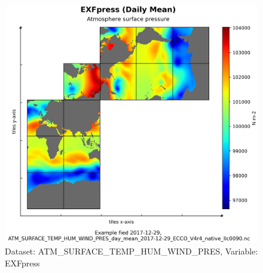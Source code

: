 \begin{figure}[H]
\centering
\includegraphics[scale=0.55]{../images/plots/native_plots/Atmosphere_Surface_Temperature_Humidity_Wind_and_Pressure/EXFpress.png}
\caption{Dataset: ATM\_SURFACE\_TEMP\_HUM\_WIND\_PRES, Variable: EXFpress}
\label{tab:table-ATM_SURFACE_TEMP_HUM_WIND_PRES_EXFpress-Plot}
\end{figure}
\pagebreak
